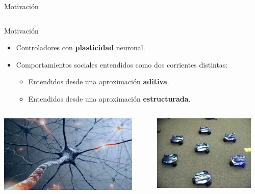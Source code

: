 \documentclass[aspectratio=169]{beamer}
\begin{document}
\begin{frame}{Motivación}
\begin{columns}
\begin{column}{0.5\textwidth}
    \end{column}
  \end{columns}
\end{frame}

\begin{frame}{Motivación}
  \begin{itemize}
    \item {Controladores con \textbf{plasticidad} neuronal.}
    \item {Comportamientos sociales entendidos como dos corrientes distintas:}
    \begin{itemize}
      \item {Entendidos desde una aproximación \textbf{aditiva}.}
      \item {Entendidos desde una aproximación \textbf{estructurada}.}
    \end{itemize}
  \end{itemize}
  \vspace{1cm}
  \begin{columns}
    \begin{column}{0.47\textwidth}
      \includegraphics[width=0.9\textwidth,height=.5\textheight]{Imagenes/Plasticidad}
    \end{column}
    \begin{column}{0.5\textwidth}
       \includegraphics[width=0.9\textwidth,height=.5\textheight]{Imagenes/Robots}
    \end{column}
  \end{columns}
\end{frame}
\end{document}
